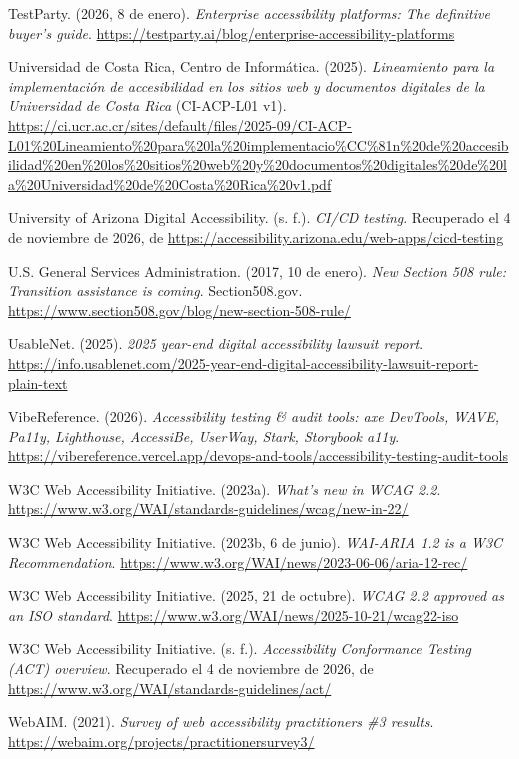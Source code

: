 \documentclass[10pt,letterpaper,onecolumn]{IEEEtran}
\begin{document}
TestParty. (2026, 8 de enero). \emph{Enterprise accessibility platforms: The definitive buyer's guide}. \url{https://testparty.ai/blog/enterprise-accessibility-platforms}

Universidad de Costa Rica, Centro de Informática. (2025). \emph{Lineamiento para la implementación de accesibilidad en los sitios web y documentos digitales de la Universidad de Costa Rica} (CI-ACP-L01 v1). \url{https://ci.ucr.ac.cr/sites/default/files/2025-09/CI-ACP-L01\%20Lineamiento\%20para\%20la\%20implementacio\%CC\%81n\%20de\%20accesibilidad\%20en\%20los\%20sitios\%20web\%20y\%20documentos\%20digitales\%20de\%20la\%20Universidad\%20de\%20Costa\%20Rica\%20v1.pdf}

University of Arizona Digital Accessibility. (s. f.). \emph{CI/CD testing}. Recuperado el 4 de noviembre de 2026, de \url{https://accessibility.arizona.edu/web-apps/cicd-testing}

U.S. General Services Administration. (2017, 10 de enero). \emph{New Section 508 rule: Transition assistance is coming}. Section508.gov. \url{https://www.section508.gov/blog/new-section-508-rule/}

UsableNet. (2025). \emph{2025 year-end digital accessibility lawsuit report}. \url{https://info.usablenet.com/2025-year-end-digital-accessibility-lawsuit-report-plain-text}

VibeReference. (2026). \emph{Accessibility testing \& audit tools: axe DevTools, WAVE, Pa11y, Lighthouse, AccessiBe, UserWay, Stark, Storybook a11y}. \url{https://vibereference.vercel.app/devops-and-tools/accessibility-testing-audit-tools}

W3C Web Accessibility Initiative. (2023a). \emph{What's new in WCAG 2.2}. \url{https://www.w3.org/WAI/standards-guidelines/wcag/new-in-22/}

W3C Web Accessibility Initiative. (2023b, 6 de junio). \emph{WAI-ARIA 1.2 is a W3C Recommendation}. \url{https://www.w3.org/WAI/news/2023-06-06/aria-12-rec/}

W3C Web Accessibility Initiative. (2025, 21 de octubre). \emph{WCAG 2.2 approved as an ISO standard}. \url{https://www.w3.org/WAI/news/2025-10-21/wcag22-iso}

W3C Web Accessibility Initiative. (s. f.). \emph{Accessibility Conformance Testing (ACT) overview}. Recuperado el 4 de noviembre de 2026, de \url{https://www.w3.org/WAI/standards-guidelines/act/}

WebAIM. (2021). \emph{Survey of web accessibility practitioners \#3 results}. \url{https://webaim.org/projects/practitionersurvey3/}
\end{document}
